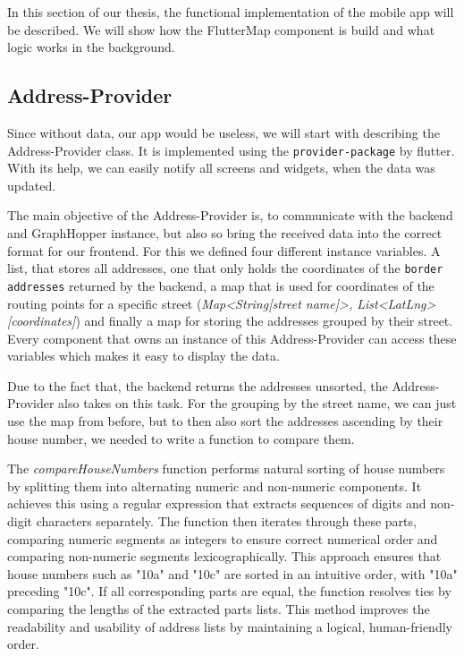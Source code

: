 \Author{\daAuthorTwo}

In this section of our thesis, the functional implementation of the mobile app will be described. We will show how the FlutterMap component is build and what logic works in the background.

\subsection{Address-Provider}

Since without data, our app would be useless, we will start with describing the Address-Provider class. It is implemented using the \texttt{provider-package} by flutter. With its help, we can easily notify all screens and widgets, when the data was updated.

\blankLine

The main objective of the Address-Provider is, to communicate with the backend and GraphHopper instance, but also so bring the received data into the correct format for our frontend. For this we defined four different instance variables. A list, that stores all addresses, one that only holds the coordinates of the \texttt{border addresses} returned by the backend, a map that is used for coordinates of the routing points for a specific street (\textit{Map<String[street name]>, List<LatLng>[coordinates]}) and finally a map for storing the addresses grouped by their street. Every component that owns an instance of this Address-Provider can access these variables which makes it easy to display the data.

\blankLine

Due to the fact that, the backend returns the addresses unsorted, the Address-Provider also takes on this task. For the grouping by the street name, we can just use the map from before, but to then also sort the addresses ascending by their house number, we needed to write a function to compare them.

\blankLine

The \textit{compareHouseNumbers} function performs natural sorting of house numbers by splitting them into alternating numeric and non-numeric components. It achieves this using a regular expression that extracts sequences of digits and non-digit characters separately. The function then iterates through these parts, comparing numeric segments as integers to ensure correct numerical order and comparing non-numeric segments lexicographically. This approach ensures that house numbers such as "10a" and "10c" are sorted in an intuitive order, with "10a" preceding "10c". If all corresponding parts are equal, the function resolves ties by comparing the lengths of the extracted parts lists. This method improves the readability and usability of address lists by maintaining a logical, human-friendly order.

